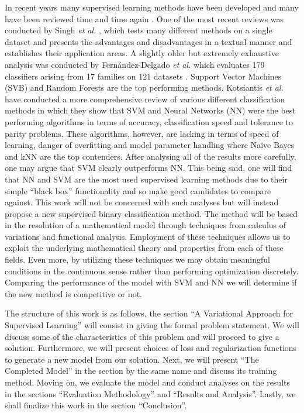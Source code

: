 \documentclass{INGUADY}
\begin{document}
\begin{body}
In recent years many supervised learning methods have been developed and many have been reviewed time and time again \cite{asingh, fernandezdel, kotsiantis, caruana}. One of the most recent reviews was conducted by Singh \textit{et al.} \cite{asingh}, which tests many different methods on a single dataset and presents the advantages and disadvantages in a textual manner and establishes their application areas. A slightly  older but extremely exhaustive analysis was conducted by Fernández-Delgado \textit{et al.} which evaluates 179 classifiers arising from 17 families on 121 datasets \cite{fernandezdel}. Support Vector Machines (SVB) and Random Forests are the top performing methods. Kotsiantis \textit{et al.} \cite{kotsiantis} have conducted a more comprehensive review of various different classification methods in which they show that SVM and Neural Networks (NN) were the best performing algorithms in terms of accuracy, classification speed and tolerance to parity problems. These algorithms, however, are lacking in terms of speed of learning, danger of overfitting and model parameter handling where Naïve Bayes and kNN are the top contenders. After analysing all of the results more carefully, one may argue that SVM clearly outperforms NN. This being said, one will find that NN and SVM are the most used supervised learning methods due to their simple ``black box'' functionality and so make good candidates to compare against. This work will not be concerned with such analyses but will instead propose a new supervised binary classification method. The method will be based in the resolution of a mathematical model through techniques from calculus of variations and functional analysis. Employment of these techniques allows us to exploit the underlying mathematical theory and properties from each of these fields. Even more, by utilizing these techniques we may obtain meaningful conditions in the continuous sense rather than performing optimization discretely. Comparing the performance of the model with SVM and NN we will determine if the new method is competitive or not.

The structure of this work is as follows, the section ``A Variational Approach for Supervised Learning'' will consist in giving the formal problem statement. We will discuss some of the characteristics of this problem and will proceed to give a solution. Furthermore, we will present choices of loss and regularization functions to generate a new model from our solution. Next, we will present ``The Completed Model'' in the section by the same name and discuss its training method. Moving on, we evaluate the model and conduct analyses on the results in the sections ``Evaluation Methodology'' and ``Results and Analysis''. Lastly, we shall finalize this work in the section ``Conclusion''.


\end{body}
\end{document}
